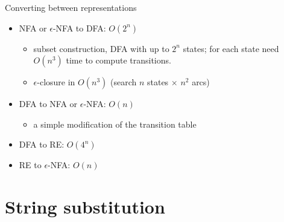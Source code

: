 \documentclass[handout]{beamer}
\begin{document}
\begin{frame}{Converting between representations}

    \begin{center}
    \end{center}
        
    \begin{itemize}
        \item NFA or $\epsilon$-NFA to DFA: $O(2^n)$
        \begin{itemize}
            \item subset construction, DFA with up to $2^n$ states; for each state need $O(n^3)$ time to compute transitions.
            \item $\epsilon$-closure in $O(n^3)$ (search $n$ states $\times$ $n^2$ arcs)
            
        \end{itemize}        
        \item DFA to NFA or $\epsilon$-NFA: $O(n)$
        \begin{itemize}
            \item a simple modification of the transition table
        \end{itemize}        
        \item DFA to RE:  $O(4^n)$        
        \item RE to $\epsilon$-NFA: $O(n)$        
    \end{itemize}

\end{frame}


\section*{String substitution}
\end{document}
